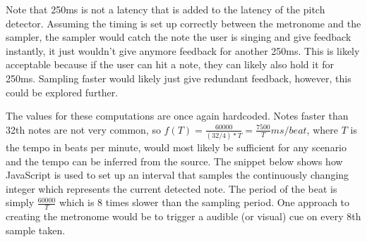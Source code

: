 Note that 250ms is not a latency that is added to the latency of the pitch detector. Assuming the timing is set up correctly between the metronome and the sampler, the sampler would catch the note the user is singing and give feedback instantly, it just wouldn't give anymore feedback for another 250ms. This is likely acceptable because if the user can hit a note, they can likely also hold it for 250ms. Sampling faster would likely just give redundant feedback, however, this could be explored further. 

The values for these computations are once again hardcoded. Notes faster than 32th notes are not very common, so $f(T) = \frac{60000}{(32/4)*T} = \frac{7500}{T} ms/beat$, where $T$ is the tempo in beats per minute, would most likely be sufficient for any scenario and the tempo can be inferred from the source. The snippet below shows how JavaScript is used to set up an interval that samples the continuously changing integer which represents the current detected note. The period of the beat is simply $\frac{60000}{T}$ which is 8 times slower than the sampling period. One approach to creating the metronome would be to trigger a audible (or visual) cue on every 8th sample taken.  


